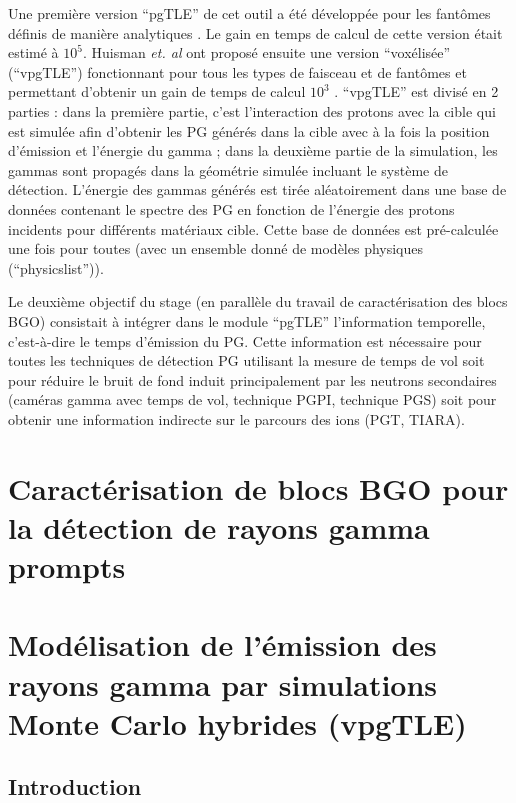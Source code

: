 \documentclass[11pt,a4paper,oldfontcommands]{memoir}
\begin{document}
Une première version \enquote{pgTLE} de cet outil a été développée pour les fantômes définis de manière analytiques \cite{El_Kanawati_2015}. Le gain en temps de calcul de cette version était estimé à $10^5$. Huisman \textit{et. al} ont proposé ensuite une version \enquote{voxélisée} (\enquote{vpgTLE}) fonctionnant pour tous les types de faisceau et de fantômes et permettant d'obtenir un gain de temps de calcul $10^3$ \cite{Huisman_2016}. \enquote{vpgTLE} est divisé en 2 parties : dans la première partie, c'est l'interaction des protons avec la cible qui est simulée afin d'obtenir les PG générés dans la cible avec à la fois la position d'émission et l'énergie du gamma  ; dans la deuxième partie de la simulation, les gammas sont propagés dans la géométrie simulée incluant le système de détection. L'énergie des gammas générés est tirée aléatoirement dans une base de données contenant le spectre des PG en fonction de l'énergie des protons incidents pour différents matériaux cible. Cette base de données est pré-calculée une fois pour toutes (avec un ensemble donné de modèles physiques (\enquote{physicslist})).

Le deuxième objectif du stage (en parallèle du travail de caractérisation des blocs BGO) consistait à intégrer dans le module \enquote{pgTLE} l'information temporelle, c'est-à-dire le temps d'émission du PG. Cette information est nécessaire pour toutes les techniques de détection PG utilisant la mesure de temps de vol soit pour réduire le bruit de fond induit principalement par les neutrons secondaires (caméras gamma avec temps de vol, technique PGPI, technique PGS) soit pour obtenir une information indirecte sur le parcours des ions (PGT, TIARA).


\openany
\chapter{Caractérisation de blocs BGO pour la détection de rayons gamma prompts}



\chapter{Modélisation de l'émission des rayons gamma par simulations Monte Carlo hybrides (vpgTLE)}

\section{Introduction}
\end{document}

